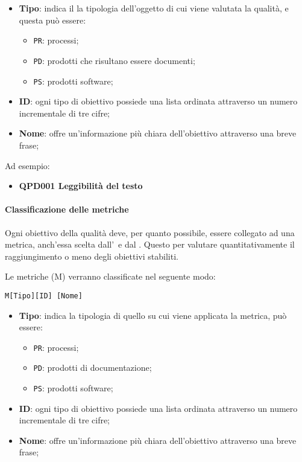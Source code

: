			\begin{itemize}
				\item \textbf{Tipo}: indica il la tipologia dell'oggetto di cui viene valutata la qualità, e questa può essere:
				\begin{itemize}
					\item \texttt{PR}: processi;
					\item \texttt{PD}: prodotti che risultano essere documenti;
					\item \texttt{PS}: prodotti software;
				\end{itemize}

				\item \textbf{ID}: ogni tipo di obiettivo possiede una lista ordinata attraverso un numero incrementale di tre cifre;
				\item \textbf{Nome}: offre un'informazione più chiara dell'obiettivo attraverso una breve frase;
			\end{itemize}

			Ad esempio:

			\begin{itemize}
				\item \textbf{QPD001 Leggibilità del testo}
			\end{itemize}


			\paragraph{Classificazione delle metriche}\label{Classificazione metriche}
			Ogni obiettivo della qualità deve, per quanto possibile, essere collegato ad una metrica, anch'essa scelta dall'\Amm\ e dal \Ver. Questo per valutare
			quantitativamente il raggiungimento o meno degli obiettivi stabiliti.

			Le metriche (M) verranno classificate nel seguente modo:

			\begin{center}
				\texttt{M[Tipo][ID] [Nome]}
			\end{center}

			\begin{itemize}
				\item \textbf{Tipo}: indica la tipologia di quello su cui viene applicata la metrica, può essere:
				\begin{itemize}
					\item \texttt{PR}: processi;
					\item \texttt{PD}: prodotti di documentazione;
					\item \texttt{PS}: prodotti software;
				\end{itemize}

				\item \textbf{ID}: ogni tipo di obiettivo possiede una lista ordinata attraverso un numero incrementale di tre cifre;
				\item \textbf{Nome}: offre un'informazione più chiara dell'obiettivo attraverso una breve frase;
			\end{itemize}

